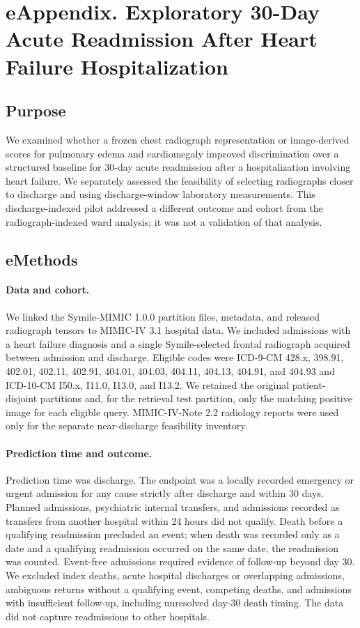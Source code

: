 \clearpage
\section*{eAppendix. Exploratory 30-Day Acute Readmission After Heart Failure Hospitalization}
\label{sec:readmission-supplement}

\subsection*{Purpose}
We examined whether a frozen chest radiograph representation or image-derived scores for pulmonary edema and cardiomegaly improved discrimination over a structured baseline for 30-day acute readmission after a hospitalization involving heart failure. We separately assessed the feasibility of selecting radiographs closer to discharge and using discharge-window laboratory measurements. This discharge-indexed pilot addressed a different outcome and cohort from the radiograph-indexed ward analysis; it was not a validation of that analysis.

\subsection*{eMethods}
\paragraph{Data and cohort.} We linked the Symile-MIMIC 1.0.0 partition files, metadata, and released radiograph tensors to MIMIC-IV 3.1 hospital data. We included admissions with a heart failure diagnosis and a single Symile-selected frontal radiograph acquired between admission and discharge. Eligible codes were ICD-9-CM 428.x, 398.91, 402.01, 402.11, 402.91, 404.01, 404.03, 404.11, 404.13, 404.91, and 404.93 and ICD-10-CM I50.x, I11.0, I13.0, and I13.2. We retained the original patient-disjoint partitions and, for the retrieval test partition, only the matching positive image for each eligible query. MIMIC-IV-Note 2.2 radiology reports were used only for the separate near-discharge feasibility inventory.

\paragraph{Prediction time and outcome.} Prediction time was discharge. The endpoint was a locally recorded emergency or urgent admission for any cause strictly after discharge and within 30 days. Planned admissions, psychiatric internal transfers, and admissions recorded as transfers from another hospital within 24 hours did not qualify. Death before a qualifying readmission precluded an event; when death was recorded only as a date and a qualifying readmission occurred on the same date, the readmission was counted. Event-free admissions required evidence of follow-up beyond day 30. We excluded index deaths, acute hospital discharges or overlapping admissions, ambiguous returns without a qualifying event, competing deaths, and admissions with insufficient follow-up, including unresolved day-30 death timing. The data did not capture readmissions to other hospitals.


